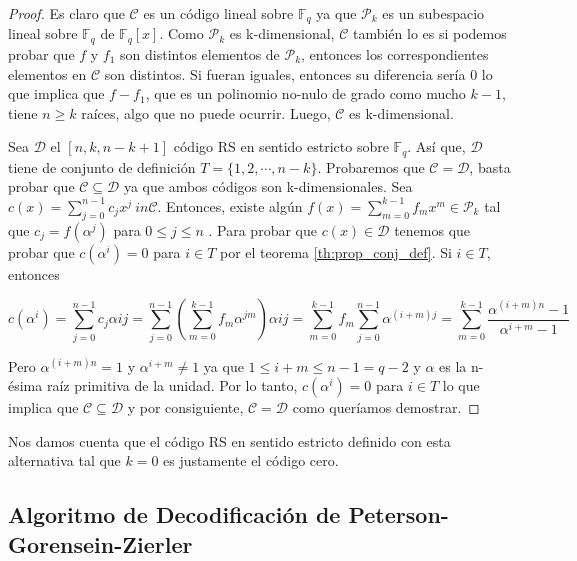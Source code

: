 \begin{proof}
Es claro que $\mathcal{C}$ es un código lineal sobre $\mathbb{F}_q$ ya que $\mathcal{P}_k$ es un subespacio lineal sobre $\mathbb{F}_q$ de $\mathbb{F}_q[x]$. Como $\mathcal{P}_k$ es k-dimensional, $\mathcal{C}$ también lo es si podemos probar que $f$ y $f_1$ son distintos elementos de $\mathcal{P}_k$, entonces los correspondientes elementos en $\mathcal{C}$ son distintos. Si fueran iguales, entonces su diferencia sería $0$ lo que implica que $f-f_1$, que es un polinomio no-nulo de grado como mucho $k-1$, tiene $n \geq k$ raíces, algo que no puede ocurrir. Luego, $\mathcal{C}$ es k-dimensional.

Sea $\mathcal{D}$  el $[n,k,n-k+1]$ código RS en sentido estricto sobre $\mathbb{F}_q$. Así que, $\mathcal{D}$ tiene de conjunto de definición $T = \{ 1,2,\cdots,n-k \}$. Probaremos que $\mathcal{C} = \mathcal{D}$, basta probar que $\mathcal{C} \subseteq \mathcal{D}$ ya que ambos códigos son k-dimensionales. Sea $c(x) = \sum_{j=0}^{n-1} c_jx^j \ in \mathcal{C}$. Entonces, existe algún $f(x) = \sum_{m=0}^{k-1} f_mx^m \in \mathcal{P}_k$ tal que $c_j=f(\alpha^j)$ para $ 0 \leq j \leq n$ . Para probar que $c(x) \in \mathcal{D}$ tenemos que probar que $c(\alpha^i) = 0$ para $i \in T$ por el teorema \ref{th:prop_conj_def}. Si $i \in T$, entonces 

\[ 
c(\alpha^i) = \sum_{j=0}^{n-1} c_j\alpha{ij} =\sum_{j=0}^{n-1} (\sum_{m=0}^{k-1}f_m\alpha^{jm})\alpha{ij} = \sum_{m=0}^{k-1}f_m  \sum_{j=0}^{n-1}\alpha^{(i+m)j}  =\sum_{m=0}^{k-1} \frac{\alpha^{(i+m)n} -1 }{\alpha^{i+m} -1  }
\]

Pero $\alpha^{(i+m)n} = 1$ y $\alpha^{i+m} \neq 1$ ya que $ 1 \leq i+m \leq n-1 = q-2$ y $\alpha$ es la n-ésima raíz primitiva de la unidad. Por lo tanto, $c(\alpha^i) = 0$ para $i \in T$ lo que implica que $\mathcal{C} \subseteq \mathcal{D}$ y por consiguiente, $\mathcal{C} = \mathcal{D}$ como queríamos demostrar.
\end{proof}

Nos damos cuenta que el código RS en sentido estricto definido con esta alternativa tal que $k=0$ es justamente el código cero.

\subsection{Algoritmo de Decodificación de Peterson-Gorensein-Zierler}

